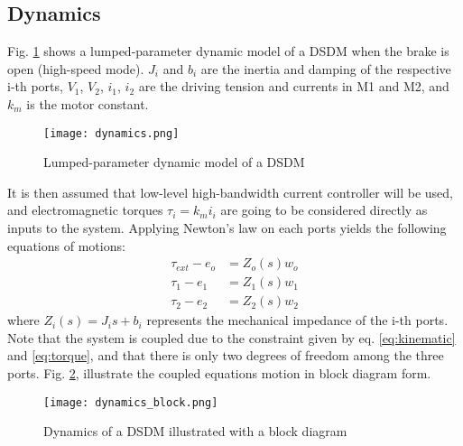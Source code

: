 \subsection{Dynamics}
\label{sec:dyn}



Fig. \ref{fig:dynamics} shows a lumped-parameter dynamic model of a DSDM when the brake is open (high-speed mode). $J_i$ and $b_i$ are the inertia and damping of the respective i-th ports, $V_1$, $V_2$, $i_1$, $i_2$ are the driving tension and currents in M1 and M2, and $k_m$ is the motor constant. 

\begin{figure}[htb]
	\centering
		\texttt{[image: dynamics.png]}
	\caption{Lumped-parameter dynamic model of a DSDM}
	\label{fig:dynamics}
\end{figure}

It is then assumed that low-level high-bandwidth current controller will be used, and electromagnetic torques $\tau_i = k_m i_i$ are going to be considered directly as inputs to the system. Applying Newton's law on each ports yields the following equations of motions:
%
\begin{align}
\tau_{ext}  - e_o &= Z_o(s) w_o \\
\tau_{1}    - e_1 &= Z_1(s) w_1 \\
\tau_{2}    - e_2 &= Z_2(s) w_2
\end{align}
%
where $Z_i(s) = J_i s + b_i$ represents the mechanical impedance of the i-th ports. Note that the system is coupled due to the constraint given by eq. \eqref{eq:kinematic} and \eqref{eq:torque}, and that there is only two degrees of freedom among the three ports. Fig. \ref{fig:dynamics_block}, illustrate the coupled equations motion in block diagram form.

\begin{figure}[htp]
	\centering
		\texttt{[image: dynamics\_block.png]}
	\caption{Dynamics of a DSDM illustrated with a block diagram}
	\label{fig:dynamics_block}
\end{figure}

